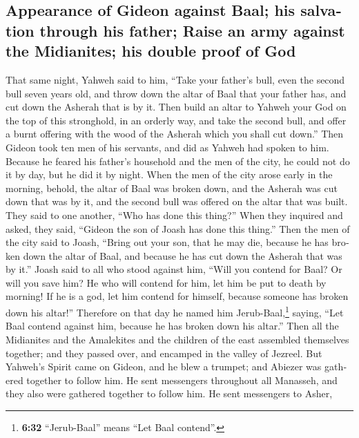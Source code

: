 \begin{paracol}{2}
\begin{otherlanguage}{english}
{\subsection{Appearance of Gideon against Baal; his salvation through his
father; Raise an army against the Midianites; his double proof of
God}\label{appearance-of-gideon-against-baal-his-salvation-through-his-father-raise-an-army-against-the-midianites-his-double-proof-of-god}}

 That same night, Yahweh said to him, ``Take your
father's bull, even the second bull seven years old, and throw down the
altar of Baal that your father has, and cut down the Asherah that is by
it.  Then build an altar to Yahweh your God on the top of
this stronghold, in an orderly way, and take the second bull, and offer
a burnt offering with the wood of the Asherah which you shall cut
down.''  Then Gideon took ten men of his servants, and
did as Yahweh had spoken to him. Because he feared his father's
household and the men of the city, he could not do it by day, but he did
it by night.  When the men of the city arose early in the
morning, behold, the altar of Baal was broken down, and the Asherah was
cut down that was by it, and the second bull was offered on the altar
that was built.  They said to one another, ``Who has done
this thing?'' When they inquired and asked, they said, ``Gideon the son
of Joash has done this thing.''  Then the men of the city
said to Joash, ``Bring out your son, that he may die, because he has
broken down the altar of Baal, and because he has cut down the Asherah
that was by it.''  Joash said to all who stood against
him, ``Will you contend for Baal? Or will you save him? He who will
contend for him, let him be put to death by morning! If he is a god, let
him contend for himself, because someone has broken down his altar!''
 Therefore on that day he named him
Jerub-Baal,\footnote{\textbf{6:32} ``Jerub-Baal'' means ``Let Baal
  contend''.} saying, ``Let Baal contend against him, because he has
broken down his altar.''  Then all the Midianites and the
Amalekites and the children of the east assembled themselves together;
and they passed over, and encamped in the valley of Jezreel.
 But Yahweh's Spirit came on Gideon, and he blew a
trumpet; and Abiezer was gathered together to follow him.
 He sent messengers throughout all Manasseh, and they
also were gathered together to follow him. He sent messengers to Asher,

\end{otherlanguage}
\end{paracol}
